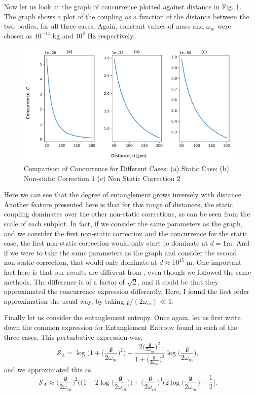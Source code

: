 \documentclass[12pt,a4paper]{report}
\theoremstyle{plain}
\theoremstyle{definition}
\theoremstyle{remark}
\begin{document}
Now let us look at the graph of concurrence plotted against distance in Fig. \ref{fig: Concurrence}. The graph shows a plot of the coupling as a function of the distance between the two bodies, for all three cases. Again, constant values of mass and $\omega_m$ were chosen as $10^{-14}$ kg and $10^8$ Hz respectively.
\begin{figure}[h]
    \centering
    \includegraphics[width=15cm]{ConcCases.pdf}
    \caption{Comparison of Concurrence for Different Cases:  (a) Static Case; (b) Non-static Correction $1$ (c) Non Static Correction $2$}
    \label{fig: Concurrence}
\end{figure}
Here we can see that the degree of entanglement grows inversely with distance. Another feature presented here is that for this range of distances, the static coupling dominates over the other non-static corrections, as can be seen from the scale of each subplot. In fact, if we consider the same parameters as the graph, and we consider the first non-static correction and the concurrence for the static case, the first non-static correction would only start to dominate at $d=1$m. And if we were to take the same parameters as the graph and consider the second non-static correction, that would only dominate at $d\approx10^{15}$ m. One important fact here is that our results are different from \citet{Bose_2022}, even though we followed the same methods. The difference is of a factor of $\sqrt{2}$, and it could be that they approximated the concurrence expression differently. Here, I found the first order approximation the usual way, by taking $\mathfrak{g}/(2\omega_{m}) \ll 1$.

Finally let us consider the entanglement entropy. Once again, let us first write down the common expression for Entanglement Entropy found in each of the three cases. This perturbative expression was,
\begin{equation}
    \mathcal{S}_A = \log\Bigg(1+ \Big(\frac{\mathfrak{g}}{2\omega_{m}}\Big)^2\Bigg) - \frac{2\Big(\frac{\mathfrak{g}}{2\omega_{m}}\Big)^2}{1+\Big(\frac{\mathfrak{g}}{2\omega_{m}}\Big)^2}\log\Big(\frac{\mathfrak{g}}{2\omega_{m}}\Big),
\end{equation}
and we approximated this as,
\begin{equation}
     \mathcal{S}_A \approx \Big(\frac{\mathfrak{g}}{2\omega_{m}}\Big)^2 \Big((1 - 2\log\Big(\frac{\mathfrak{g}}{2\omega_{m}}\Big)\Big) + \Big(\frac{\mathfrak{g}}{2\omega_{m}}\Big)^4 \Big(2\log\Big(\frac{\mathfrak{g}}{2\omega_{m}}\Big) - \frac{1}{2}\Big).
\end{equation}
\end{document}

